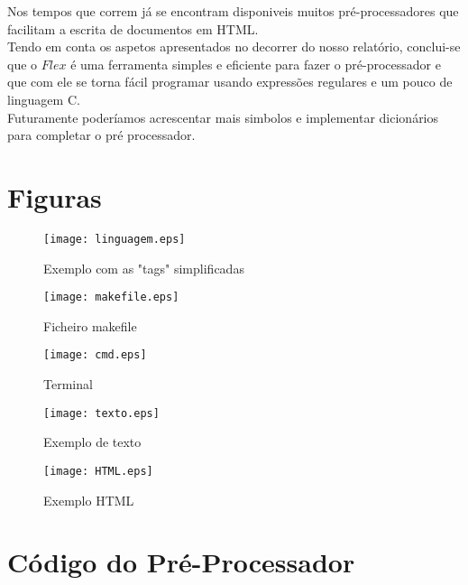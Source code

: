 \documentclass{report}
\begin{document}
Nos tempos que correm já se encontram disponiveis muitos pré-processadores que facilitam a escrita de documentos em HTML.\\
Tendo em conta os aspetos apresentados no decorrer do nosso relatório, conclui-se que o $Flex$ é uma ferramenta simples e eficiente para fazer o pré-processador e que com ele se torna fácil programar usando expressões regulares e um pouco de linguagem C. \\
Futuramente poderíamos acrescentar mais simbolos e implementar dicionários para completar o pré processador.


\appendix
\chapter{Figuras}
\begin{figure}[ht]
\centering
\texttt{[image: linguagem.eps]}
\caption{Exemplo com as "tags" simplificadas}
\label{Exemplo 1}
\end{figure}

\begin{figure}[ht]
\centering
\texttt{[image: makefile.eps]}
\caption{Ficheiro makefile}
\label{makefile}
\end{figure}

\begin{figure}[ht]
\centering
\texttt{[image: cmd.eps]}
\caption{Terminal}
\label{Terminal}
\end{figure}

\begin{figure}[ht]
\centering
\texttt{[image: texto.eps]}
\caption{Exemplo de texto}
\label{Ficheiro em txt}
\end{figure}

\begin{figure}[ht]
\centering
\texttt{[image: HTML.eps]}
\caption{Exemplo HTML}
\label{HTML}
\end{figure}


\chapter{Código do Pré-Processador}
\end{document}
